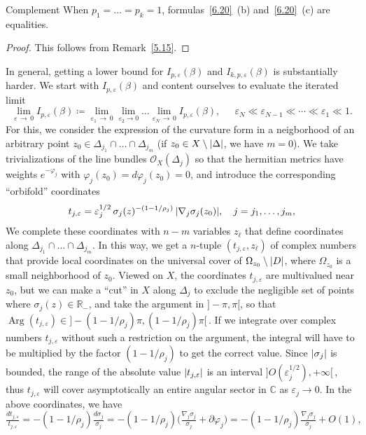 \documentclass[AHL,Unicode,longabstracts,published]{cedram}
\DeclareMathOperator{\Arg}{Arg}
\DeclarePairedDelimiter{\abs}{\lvert}{\rvert}
\newcommand*\cO{\mathcal{O}}
\newcommand*\bC{\mathbb{C}}
\newcommand*\bR{\mathbb{R}}
\newcommand*\bydef{\coloneqq}
\begin{document}
\begin{enonce}{Complement}\label{6.21}
When $p_1=\ldots=p_k=1$, formulas~\ref{6.20}~(b) and~\ref{6.20}~(c) are equalities.
\end{enonce}
\begin{proof}
This follows from Remark~\ref{5.15}.
\end{proof}

In general, getting a lower bound for $I_{p,\varepsilon}(\beta)$ and
$I_{k,p,\varepsilon}(\beta)$ is substantially harder. We start with
$I_{p,\varepsilon}(\beta)$ and content ourselves to evaluate the iterated limit
\[
\lim_{\varepsilon\,\to\,0}I_{p,\varepsilon}(\beta)
\bydef
\lim_{\varepsilon_1\,\to\,0}\lim_{\varepsilon_2\to 0}\ldots\lim_{\varepsilon_N\,\to\,0} I_{p,\varepsilon}(\beta),
\quad~~
\varepsilon_N
\ll
\varepsilon_{N-1}
\ll \dotsb \ll
\varepsilon_1
\ll 1.
\]
For this, we consider the expression of the curvature form in a neigborhood of an arbitrary point
$z_0\in\Delta_{j_1}\cap\ldots\cap\Delta_{j_m}$ (if $z_0\in X\setminus\abs{\Delta}$, we have $m=0$). We take trivializations of the line bundles
$\cO_X(\Delta_j)$ so that the hermitian metrics have weights
$e^{-\varphi_j}$ with $\varphi_j(z_0)=d\varphi_j(z_0)=0$, and introduce the corresponding ``orbifold'' coordinates
\[
t_{j,\varepsilon}=\varepsilon_j^{1/2}\,\sigma_j(z)^{-(1-1/\rho_j)}\,\abs{\nabla_j\sigma_j(z_0)},
\quad j=j_1,\dotsc,j_m,
\]
We complete these coordinates with $n-m$ variables $z_\ell$ that define coordinates along $\Delta_{j_1}\cap\ldots\cap\Delta_{j_m}$. In this way, we get a $n$-tuple $(t_{j,\varepsilon},z_\ell)$ of complex numbers that provide local coordinates on the universal cover of $\Omega_{z_0}\setminus\abs{D}$, where $\Omega_{z_0}$ is a small neighborhood of $z_0$. Viewed on $X$, the coordinates $t_{j,\varepsilon}$ are multivalued near $z_0$, but we can make a ``cut'' in $X$ along $\Delta_j$ to exclude the negligible set of points where
$\sigma_j(z)\in\bR_-$, and take the argument in $]-\pi,\pi[$, so that
$\Arg(t_{j,\varepsilon})\in{}]-(1-1/\rho_j)\pi,(1-1/\rho_j)\pi[\,$. If we integrate over complex numbers $t_{j,\varepsilon}$ without such a restriction on the argument, the integral will have to be multiplied by the factor $(1-1/\rho_j)$ to get the correct value. Since $\abs{\sigma_j}$ is bounded, the range of the absolute value $\abs{t_{j,\varepsilon}}$ is an interval
$]O(\varepsilon_j^{1/2}),+\infty[\,$, thus $t_{j,\varepsilon}$ will cover asymptotically an entire angular sector in $\bC$ as $\varepsilon_j\to 0$. In the above coordinates, we have
\[
\tfrac{dt_{j,\varepsilon}}{ t_{j,\varepsilon}}=-(1-1/\rho_j)\tfrac{d\sigma_j}{\sigma_j}= -(1-1/\rho_j)\bigg(\tfrac{\nabla_j\sigma_j}{\sigma_j}+\partial\varphi_j\bigg)= -(1-1/\rho_j)\tfrac{\nabla_j\sigma_j}{\sigma_j}+O(1),
\]
\end{document}
